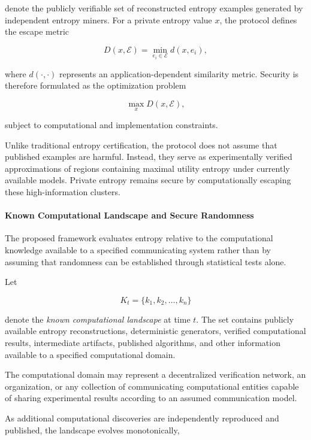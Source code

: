 \documentclass[11pt]{article}
\begin{document}
denote the publicly verifiable set of reconstructed entropy examples
generated by independent entropy miners.
For a private entropy value $x$,
the protocol defines the escape metric

\[
D(x,\mathcal{E})
=
\min_{e_i\in\mathcal{E}}
d(x,e_i),
\]

where $d(\cdot,\cdot)$ represents an application-dependent similarity
metric.
Security is therefore formulated as the optimization problem

\[
\max_x D(x,\mathcal{E}),
\]

subject to computational and implementation constraints.

Unlike traditional entropy certification,
the protocol does not assume that published examples are harmful.
Instead,
they serve as experimentally verified approximations of regions
containing maximal utility entropy under currently available models.
Private entropy remains secure by computationally escaping these
high-information clusters.


\paragraph{Known Computational Landscape and Secure Randomness}

The proposed framework evaluates entropy relative to the computational
knowledge available to a specified communicating system rather than by
assuming that randomness can be established through statistical tests
alone.

Let

\[
K_t
=
\{k_1,k_2,\ldots,k_n\}
\]

denote the \emph{known computational landscape} at time \(t\).
The set contains publicly available entropy reconstructions,
deterministic generators,
verified computational results,
intermediate artifacts,
published algorithms,
and other information available to a specified computational domain.

The computational domain may represent a decentralized verification
network,
an organization,
or any collection of communicating computational entities capable of
sharing experimental results according to an assumed communication
model.

As additional computational discoveries are independently reproduced
and published,
the landscape evolves monotonically,
\end{document}
